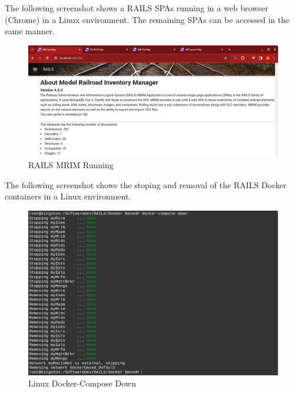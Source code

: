 The following screenshot shows a \ac{RAILS} \acp{SPA} running in a web browser (Chrome) in a Linux environment. The remaining \acp{SPA} can be accessed in the same manner.
\begin{figure}[H]
    \centering
    \includegraphics[scale=0.36]{mriml.png}
    \caption{RAILS MRIM Running}
    \label{fig:rails-mrim}
\end{figure}
The following screenshot shows the stoping and removal of the \ac{RAILS} Docker containers in a Linux environment.
\begin{figure}[H]
    \centering
    \includegraphics[scale=0.44]{win4l.png}
    \caption{Linux Docker-Compose Down}
    \label{fig:linux-docker-cmds-4}
\end{figure}
